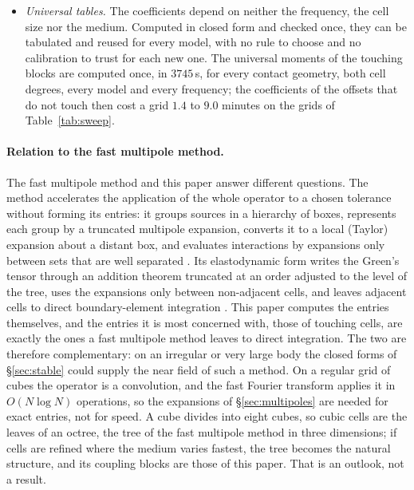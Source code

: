 \documentclass[11pt,a4paper]{article}
\begin{document}
\begin{itemize}
\item \emph{Universal tables.} The coefficients depend on neither the frequency, the cell size nor the
medium. Computed in closed form and checked once, they can be tabulated and reused for every model, with no
rule to choose and no calibration to trust for each new one. The universal moments of the touching blocks
are computed once, in $3745$\,s, for every contact geometry, both cell degrees, every model and every
frequency; the coefficients of the offsets that do not touch then cost a grid $1.4$ to $9.0$ minutes on the
grids of Table~\ref{tab:sweep}.
\end{itemize}

\paragraph{Relation to the fast multipole method.} The fast multipole method and this paper answer different
questions. The method accelerates the
application of the whole operator to a chosen tolerance without forming its entries: it groups sources
in a hierarchy of boxes, represents each group by a truncated multipole expansion, converts it to a local
(Taylor) expansion about a distant box, and evaluates interactions by expansions only between sets that
are well separated \citep{CarrierGreengardRokhlin1988}. Its elastodynamic form writes the Green's tensor
through an addition theorem truncated at an order adjusted to the level of the tree, uses the expansions
only between non-adjacent cells, and leaves adjacent cells to direct boundary-element integration
\citep{ChaillatBonnetSemblat2007,Chaillat2008}. This paper computes the entries themselves, and the
entries it is most concerned with, those of touching cells, are exactly the ones a fast multipole method
leaves to direct integration. The two are therefore complementary: on an irregular or very large body the
closed forms of \S\ref{sec:stable} could supply the near field of such a method. On a regular grid of
cubes the operator is a convolution, and the fast Fourier transform applies it in $O(N\log N)$
operations, so the expansions of \S\ref{sec:multipoles} are needed for exact entries, not for speed. A cube
divides into eight cubes, so cubic cells are the leaves of an octree, the tree of the fast multipole
method in three dimensions; if cells are refined where the medium varies fastest, the tree becomes the
natural structure, and its coupling blocks are those of this paper. That is an outlook, not a result.
\end{document}
